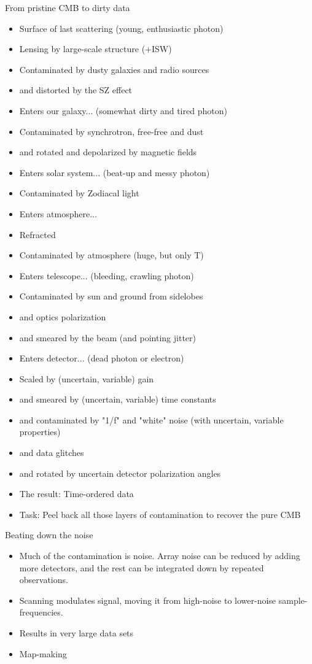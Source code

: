 \documentclass{beamer}
\begin{document}
\begin{frame}{From pristine CMB to dirty data}
	\begin{itemize}
		\item Surface of last scattering (young, enthusiastic photon)
		\item Lensing by large-scale structure (+ISW)
		\item Contaminated by dusty galaxies and radio sources
		\item and distorted by the SZ effect
		\item Enters our galaxy... (somewhat dirty and tired photon)
		\item Contaminated by synchrotron, free-free and dust
		\item and rotated and depolarized by magnetic fields
		\item Enters solar system... (beat-up and messy photon)
		\item Contaminated by Zodiacal light
		\item Enters atmosphere...
		\item Refracted
		\item Contaminated by atmosphere (huge, but only T)
		\item Enters telescope... (bleeding, crawling photon)
		\item Contaminated by sun and ground from sidelobes
		\item and optics polarization
		\item and smeared by the beam (and pointing jitter)
		\item Enters detector... (dead photon or electron)
		\item Scaled by (uncertain, variable) gain
		\item and smeared by (uncertain, variable) time constants
		\item and contaminated by "1/f" and "white" noise (with uncertain, variable properties)
		\item and data glitches
		\item and rotated by uncertain detector polarization angles
		\item The result: Time-ordered data
		\item Task: Peel back all those layers of contamination to recover the pure CMB
	\end{itemize}
\end{frame}

\begin{frame}{Beating down the noise}
	\begin{itemize}
		\item Much of the contamination is noise. Array noise can be reduced by
			adding more detectors, and the rest can be integrated down by repeated
			observations.
		\item Scanning modulates signal, moving it from high-noise to lower-noise
			sample-frequencies.
		\item Results in very large data sets
		\item Map-making
	\end{itemize}
\end{frame}
\end{document}

